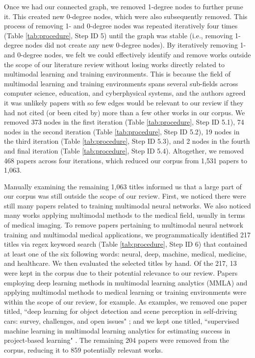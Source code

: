 \documentclass[manuscript,screen,review]{acmart}
\begin{document}
Once we had our connected graph, we removed 1-degree nodes to further prune it. This created new 0-degree nodes, which were also subsequently removed. This process of removing 1- and 0-degree nodes was repeated iteratively four times (Table \ref{tab:procedure}, Step ID 5) until the graph was stable (i.e., removing 1-degree nodes did not create any new 0-degree nodes). By iteratively removing 1- and 0-degree nodes, we felt we could effectively identify and remove works outside the scope of our literature review without losing works directly related to multimodal learning and training environments. This is because the field of multimodal learning and training environments spans several sub-fields across computer science, education, and cyberphysical systems, and the authors agreed it was unlikely papers with so few edges would be relevant to our review if they had not cited (or been cited by) more than a few other works in our corpus. We removed 373 nodes in the first iteration (Table \ref{tab:procedure}, Step ID 5.1), 74 nodes in the second iteration (Table \ref{tab:procedure}, Step ID 5.2), 19 nodes in the third iteration (Table \ref{tab:procedure}, Step ID 5.3), and 2 nodes in the fourth and final iteration (Table \ref{tab:procedure}, Step ID 5.4). Altogether, we removed 468 papers across four iterations, which reduced our corpus from 1,531 papers to 1,063. 

Manually examining the remaining 1,063 titles informed us that a large part of our corpus was still outside the scope of our review. First, we  noticed there were still many papers related to training multimodal neural networks. We also noticed many works applying multimodal methods to the medical field, usually in terms of medical imaging. To remove papers pertaining to multimodal neural network training and multimodal medical applications, we programmatically identified 217 titles via regex keyword search (Table \ref{tab:procedure}, Step ID 6) that contained at least one of the six following words: neural, deep, machine, medical, medicine, and healthcare. We then evaluated the selected titles by hand. Of the 217, 13 were kept in the corpus due to their potential relevance to our review. Papers employing deep learning methods in multimodal learning analytics (MMLA) and applying multimodal methods to medical learning or training environments were within the scope of our review, for example. As examples, we removed one paper titled, ``deep learning for object detection and scene perception in self-driving cars: survey, challenges, and open issues" \cite{gupta2021deep}; and we kept one titled, ``supervised machine learning in multimodal learning analytics for estimating success in project‐based learning" \cite{1637690235}. The remaining 204 papers were removed from the corpus, reducing it to 859 potentially relevant works.
\end{document}
